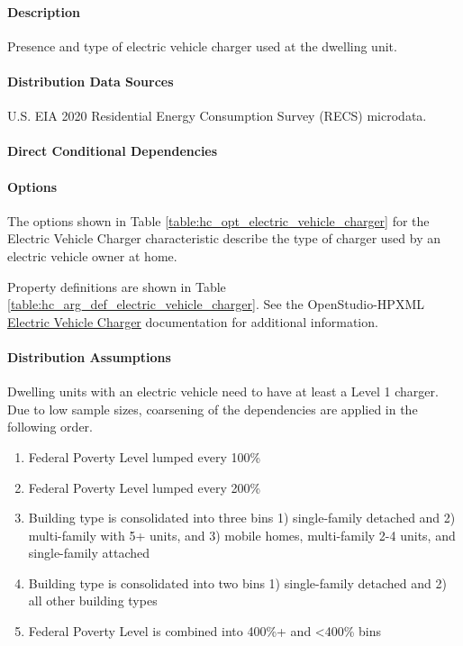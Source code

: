 \paragraph{Description}
% 
Presence and type of electric vehicle charger used at the dwelling unit.

\paragraph{Distribution Data Sources}
% 
U.S. EIA 2020 Residential Energy Consumption Survey (RECS) microdata.

\paragraph{Direct Conditional Dependencies}


\paragraph{Options}
The options shown in Table \ref{table:hc_opt_electric_vehicle_charger} for the Electric Vehicle Charger characteristic describe the type of charger used by an electric vehicle owner at home.



Property definitions are shown in Table \ref{table:hc_arg_def_electric_vehicle_charger}. See the OpenStudio-HPXML \href{https://openstudio-hpxml.readthedocs.io/en/v1.10.0/workflow_inputs.html#hpxml-electric-vehicle-chargers}{Electric Vehicle Charger} documentation for additional information.



\paragraph{Distribution Assumptions}
% 
Dwelling units with an electric vehicle need to have at least a Level 1 charger. Due to low sample sizes, coarsening of the dependencies are applied in the following order.
\begin{enumerate}
  \item Federal Poverty Level lumped every 100\%
  \item Federal Poverty Level lumped every 200\%
  \item Building type is consolidated into three bins 1) single-family detached and 2) multi-family with 5+ units, and 3) mobile homes, multi-family 2-4 units, and single-family attached
  \item Building type is consolidated into two bins 1) single-family detached and 2) all other building types
  \item Federal Poverty Level is combined into 400\%+ and <400\% bins
\end{enumerate}
